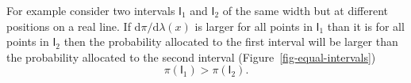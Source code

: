 \documentclass[
  letterpaper,
  DIV=11,
  numbers=noendperiod]{scrartcl}
\begin{document}
For example consider two intervals \(\mathsf{I}_{1}\) and
\(\mathsf{I}_{2}\) of the same width but at different positions on a
real line. If \(\mathrm{d} \pi / \mathrm{d} \lambda (x)\) is larger for
all points in \(\mathsf{I}_{1}\) than it is for all points in
\(\mathsf{I}_{2}\) then the probability allocated to the first interval
will be larger than the probability allocated to the second interval
(Figure~\ref{fig-equal-intervals}) \[
\pi(\mathsf{I}_{1}) > \pi(\mathsf{I}_{2}).
\]

\begin{figure}

\begin{minipage}[t]{0.01\linewidth}

{\centering 

~

}

\end{minipage}%
%
\begin{minipage}[t]{0.49\linewidth}

{\centering 


}

\subcaption{\label{fig-equal-intervals}}
\end{minipage}%
%
\begin{minipage}[t]{0.49\linewidth}

{\centering 

}
\end{minipage}
\end{figure}
\end{document}
